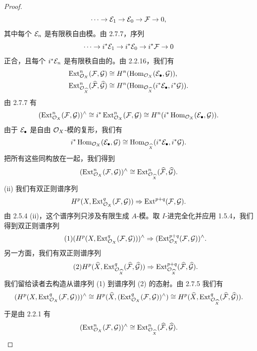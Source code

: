 \begin{proof}
\begin{equation*}
\cdots\to\mathcal{E}_1\to\mathcal{E}_0\to\mathcal{F}\to 0,
\end{equation*}
其中每个 $\mathcal{E}_n$ 是有限秩自由模。由 2.7.7，序列
\begin{equation*}
\cdots\to i^*\mathcal{E}_1\to i^*\mathcal{E}_0\to i^*\mathcal{F}\to 0
\end{equation*}
正合，且每个 $i^*\mathcal{E}_n$ 是有限秩自由的。由 2.2.16，我们有
\begin{align*}
\operatorname{Ext}^n_{\mathcal{O}_X}(\mathcal{F},\mathcal{G})&\cong H^n(\operatorname{Hom}_{\mathcal{O}_X}(\mathcal{E}_{\bullet},\mathcal{G})),\\
\operatorname{Ext}^n_{\mathcal{O}_{\widehat{X}}}(\widehat{\mathcal{F}},\widehat{\mathcal{G}})&\cong H^n(\operatorname{Hom}_{\mathcal{O}_{\widehat{X}}}(i^*\mathcal{E}_{\bullet},i^*\mathcal{G})).
\end{align*}
由 2.7.7 有
\begin{equation*}
(\operatorname{Ext}^n_{\mathcal{O}_X}(\mathcal{F},\mathcal{G}))^{\wedge}\cong i^*\operatorname{Ext}^n_{\mathcal{O}_X}(\mathcal{F},\mathcal{G})\cong H^n(i^*\operatorname{Hom}_{\mathcal{O}_X}(\mathcal{E}_{\bullet},\mathcal{G})).
\end{equation*}
由于 $\mathcal{E}_{\bullet}$ 是自由 $\mathcal{O}_X$-模的复形，我们有
\begin{equation*}
i^*\operatorname{Hom}_{\mathcal{O}_X}(\mathcal{E}_{\bullet},\mathcal{G})\cong\operatorname{Hom}_{\mathcal{O}_{\widehat{X}}}(i^*\mathcal{E}_{\bullet},i^*\mathcal{G}).
\end{equation*}
把所有这些同构放在一起，我们得到
\begin{equation*}
(\operatorname{Ext}^n_{\mathcal{O}_X}(\mathcal{F},\mathcal{G}))^{\wedge}\cong\operatorname{Ext}^n_{\mathcal{O}_{\widehat{X}}}(\widehat{\mathcal{F}},\widehat{\mathcal{G}}).
\end{equation*}
(ii) 我们有双正则谱序列
\begin{equation*}
H^p(X,\operatorname{Ext}^q_{\mathcal{O}_X}(\mathcal{F},\mathcal{G}))\Rightarrow\operatorname{Ext}^{p+q}(\mathcal{F},\mathcal{G}).
\end{equation*}
由 2.5.4 (ii)，这个谱序列只涉及有限生成 $A$-模。取 $I$-进完全化并应用 1.5.4，我们得到双正则谱序列
\begin{equation*}\tag{1}
(H^p(X,\operatorname{Ext}^q_{\mathcal{O}_X}(\mathcal{F},\mathcal{G})))^{\wedge}\Rightarrow(\operatorname{Ext}^{p+q}_{\mathcal{O}_X}(\mathcal{F},\mathcal{G}))^{\wedge}.
\end{equation*}
另一方面，我们有双正则谱序列
\begin{equation*}\tag{2}
H^p(\widehat{X},\operatorname{Ext}^q_{\mathcal{O}_{\widehat{X}}}(\widehat{\mathcal{F}},\widehat{\mathcal{G}}))\Rightarrow\operatorname{Ext}^{p+q}_{\mathcal{O}_{\widehat{X}}}(\widehat{\mathcal{F}},\widehat{\mathcal{G}}).
\end{equation*}
我们留给读者去构造从谱序列 (1) 到谱序列 (2) 的态射。由 2.7.5 我们有
\begin{equation*}
(H^p(X,\operatorname{Ext}^q_{\mathcal{O}_X}(\mathcal{F},\mathcal{G})))^{\wedge}\cong H^p(\widehat{X},(\operatorname{Ext}^q_{\mathcal{O}_X}(\mathcal{F},\mathcal{G}))^{\wedge})\cong H^p(\widehat{X},\operatorname{Ext}^q_{\mathcal{O}_{\widehat{X}}}(\widehat{\mathcal{F}},\widehat{\mathcal{G}})).
\end{equation*}
于是由 2.2.1 有
\begin{equation*}
(\operatorname{Ext}^n_{\mathcal{O}_X}(\mathcal{F},\mathcal{G}))^{\wedge}\cong\operatorname{Ext}^n_{\mathcal{O}_{\widehat{X}}}(\widehat{\mathcal{F}},\widehat{\mathcal{G}}).
\end{equation*}
\end{proof}

